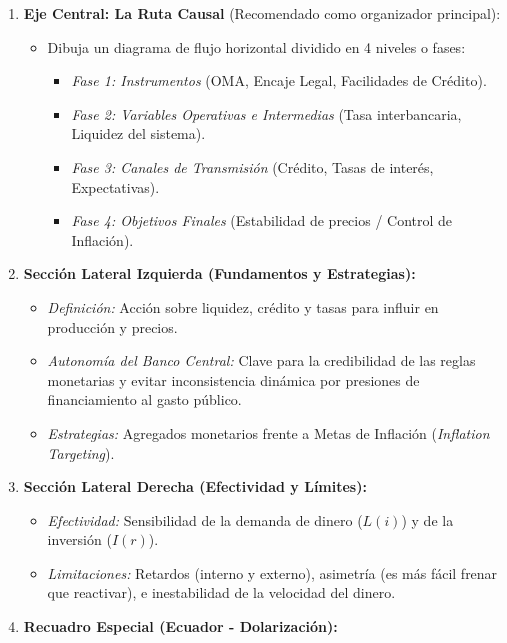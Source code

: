 \documentclass[12pt,spanish]{article}
\providecommand{\tightlist}{%
  \setlength{\itemsep}{0pt}\setlength{\parskip}{0pt}}
\begin{document}
\begin{enumerate}
\def\labelenumi{\arabic{enumi}.}
\tightlist
\item
  \textbf{Eje Central: La Ruta Causal} (Recomendado como organizador
  principal):

  \begin{itemize}
  \tightlist
  \item
    Dibuja un diagrama de flujo horizontal dividido en 4 niveles o
    fases:

    \begin{itemize}
    \tightlist
    \item
      \emph{Fase 1: Instrumentos} (OMA, Encaje Legal, Facilidades de
      Crédito).
    \item
      \emph{Fase 2: Variables Operativas e Intermedias} (Tasa
      interbancaria, Liquidez del sistema).
    \item
      \emph{Fase 3: Canales de Transmisión} (Crédito, Tasas de interés,
      Expectativas).
    \item
      \emph{Fase 4: Objetivos Finales} (Estabilidad de precios / Control
      de Inflación).
    \end{itemize}
  \end{itemize}
\item
  \textbf{Sección Lateral Izquierda (Fundamentos y Estrategias):}

  \begin{itemize}
  \tightlist
  \item
    \emph{Definición:} Acción sobre liquidez, crédito y tasas para
    influir en producción y precios.
  \item
    \emph{Autonomía del Banco Central:} Clave para la credibilidad de
    las reglas monetarias y evitar inconsistencia dinámica por presiones
    de financiamiento al gasto público.
  \item
    \emph{Estrategias:} Agregados monetarios frente a Metas de Inflación
    (\emph{Inflation Targeting}).
  \end{itemize}
\item
  \textbf{Sección Lateral Derecha (Efectividad y Límites):}

  \begin{itemize}
  \tightlist
  \item
    \emph{Efectividad:} Sensibilidad de la demanda de dinero (\(L(i)\))
    y de la inversión (\(I(r)\)).
  \item
    \emph{Limitaciones:} Retardos (interno y externo), asimetría (es más
    fácil frenar que reactivar), e inestabilidad de la velocidad del
    dinero.
  \end{itemize}
\item
  \textbf{Recuadro Especial (Ecuador - Dolarización):}


\end{enumerate}
\end{document}
